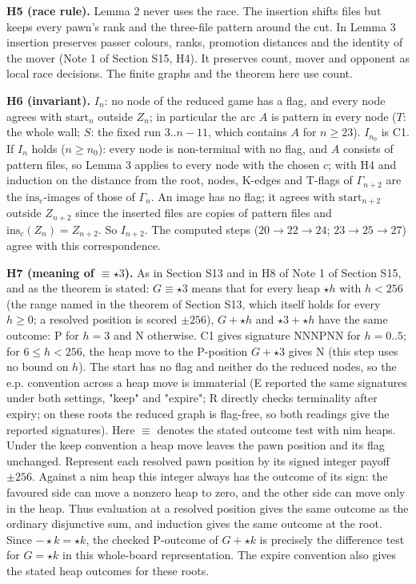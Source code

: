 \textbf{H5 (race rule).} Lemma 2 never uses the race. The insertion shifts files but keeps every pawn's rank and the three-file pattern around the cut. In Lemma 3 insertion preserves passer colours, ranks, promotion distances and the identity of the mover (Note 1 of Section S15, H4). It preserves count, mover and opponent as local race decisions. The finite graphs and the theorem here use count.

\textbf{H6 (invariant).} $I_n$: no node of the reduced game has a flag, and every node agrees with $\mathrm{start}_n$ outside $Z_n$; in particular the arc $A$ is pattern in every node ($T$: the whole wall; $S$: the fixed run $3..n-11$, which contains $A$ for $n\ge23$). $I_{n_0}$ is C1. If $I_n$ holds ($n\ge n_0$): every node is non-terminal with no flag, and $A$ consists of pattern files, so Lemma 3 applies to every node with the chosen $c$; with H4 and induction on the distance from the root, nodes, K-edges and T-flags of $\Gamma_{n+2}$ are the $\mathrm{ins}_c$-images of those of $\Gamma_n$. An image has no flag; it agrees with $\mathrm{start}_{n+2}$ outside $Z_{n+2}$ since the inserted files are copies of pattern files and $\mathrm{ins}_c(Z_n)=Z_{n+2}$. So $I_{n+2}$. The computed steps ($20\to22\to24$; $23\to25\to27$) agree with this correspondence.

\textbf{H7 (meaning of $\equiv\star3$).} As in Section S13 and in H8 of Note 1 of Section S15, and as the theorem is stated: $G\equiv\star3$ means that for every heap $\star h$ with $h<256$ (the range named in the theorem of Section S13, which itself holds for every $h\ge0$; a resolved position is scored $\pm256$), $G+\star h$ and $\star3+\star h$ have the same outcome: P for $h=3$ and N otherwise. C1 gives signature NNNPNN for $h=0..5$; for $6\le h<256$, the heap move to the P-position $G+\star3$ gives N (this step uses no bound on $h$). The start has no flag and neither do the reduced nodes, so the e.p. convention across a heap move is immaterial (E reported the same signatures under both settings, "keep" and "expire"; R directly checks terminality after expiry; on these roots the reduced graph is flag-free, so both readings give the reported signatures). Here $\equiv$ denotes the stated outcome test with nim heaps. Under the keep convention a heap move leaves the pawn position and its flag unchanged. Represent each resolved pawn position by its signed integer payoff $\pm256$. Against a nim heap this integer always has the outcome of its sign: the favoured side can move a nonzero heap to zero, and the other side can move only in the heap. Thus evaluation at a resolved position gives the same outcome as the ordinary disjunctive sum, and induction gives the same outcome at the root. Since $-\star k=\star k$, the checked P-outcome of $G+\star k$ is precisely the difference test for $G=\star k$ in this whole-board representation. The expire convention also gives the stated heap outcomes for these roots.

